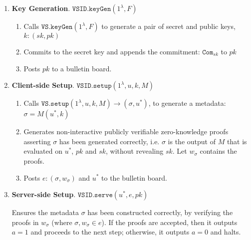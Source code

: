 

\begin{enumerate}
\item\textbf{Key Generation}\label{VSID::keygen}. $\mathtt{VSID.keyGen}(1^{\lambda},F)$ 
\begin{enumerate}
\item Calls  $\mathtt{VS.keyGen}(1^{\lambda},F)$ to generate a pair of secret and public keys, $k:(sk,pk)$
\item Commits to the secret key and appends the commitment: $\mathtt{Com}_{\scriptscriptstyle sk}$ to $pk$
\item Posts $pk$ to a bulletin board. %
\end{enumerate}

\item\textbf{Client-side Setup}\label{VSID::Client-side-Setup}. $\mathtt{VSID.setup}(1^{\lambda}, u,k,M)$
\begin{enumerate}
\item Calls  $\mathtt{VS.setup}(1^{\lambda}, u,k,M)\rightarrow (\sigma,u^{\scriptscriptstyle *})$, to generate a   metadata: $\sigma=M(u^{\scriptscriptstyle *},k)$

\item Generates non-interactive publicly verifiable zero-knowledge proofs asserting  $\sigma$ has been generated correctly, i.e. $\sigma$ is the output of  $M$ that is evaluated on $u^{\scriptscriptstyle *}$, $pk$ and $sk$, without revealing $sk$. Let $w_{\scriptscriptstyle\sigma}$ contains the proofs.
\item\label{vsid::post-metadata} Posts $e:(\sigma,w_{\scriptscriptstyle\sigma})$ and $u^{\scriptscriptstyle *}$ to the bulletin board. 
\end{enumerate}

\item\textbf{Server-side Setup}. $\mathtt{VSID.serve}(u^{\scriptscriptstyle *},e,pk)$

Ensures the metadata $\sigma$ has been constructed correctly, by verifying the proofs in $w_{\sigma}$ (where $\sigma,w_{\scriptscriptstyle\sigma}\in e$). If the proofs are accepted, then it outputs $a=1$  and proceeds to the next step; otherwise, it outputs $a=0$ and halts. 



\end{enumerate}
